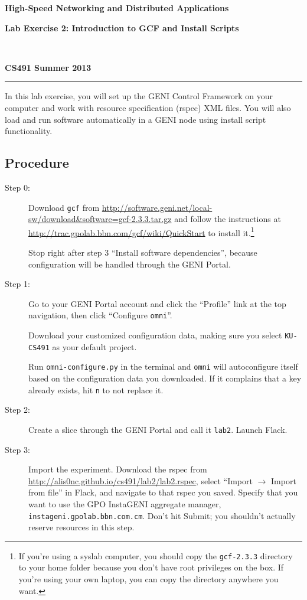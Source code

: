 \documentclass[12pt,letterpaper]{article}
\makeatletter
\newcommand*{\textoverline}[1]{$\overline{\hbox{#1}}\m@th$}
\newcommand*{\fitb}[2]
{\raisebox{-1.3ex}{\textoverline{{\makebox[#1]{{\rule{0pt}{5pt}\tiny #2}}}}}}
\makeatother
\begin{document}
\raggedright
\centerline{\textbf{High-Speed Networking and Distributed Applications}}
\centerline{\textbf{Lab Exercise 2: Introduction to GCF and Install Scripts}}
~\\
\centerline{\textbf{CS491 \hfill Summer 2013}}
\noindent\rule{\textwidth}{1pt}

\bigskip
In this lab exercise, you will set up the GENI Control Framework on your 
computer and work with resource specification (rspec) XML files. You will also 
load and run software automatically in a GENI node using install 
script functionality.


\subsection*{Procedure}

\begin{description}

\item[Step 0:]
Download \texttt{gcf} from  
\url{http://software.geni.net/local-sw/download&software=gcf-2.3.3.tar.gz} 
and follow the instructions at 
\url{http://trac.gpolab.bbn.com/gcf/wiki/QuickStart} to install it.\footnote
    {If you're using a syslab computer, you should copy the 
    \texttt{gcf-2.3.3} directory to your home folder because you don't have 
    root privileges on the box. If you're using your own laptop, you can copy 
    the directory anywhere you want.}
    
Stop right after step 3 ``Install software dependencies'', because 
configuration will be handled through the GENI Portal.

\item[Step 1:]
Go to your GENI Portal account and click the ``Profile'' link at the top 
navigation, then click ``Configure \texttt{omni}''. 

Download your customized configuration data, making sure you select 
\texttt{KU-CS491} as your default project.

Run \texttt{omni-configure.py}
in the terminal and \texttt{omni} will autoconfigure itself based on the 
configuration data you downloaded. If it complains that a key already exists, 
hit \texttt{n} to not replace it.

\item[Step 2:]
Create a slice through the GENI Portal and call it 
\texttt{\fitb{1in}{username}lab2}. Launch Flack.

\item[Step 3:]
Import the experiment. Download the rspec from
\url{http://alis0nc.github.io/cs491/lab2/lab2.rspec}, 
select ``Import $\rightarrow$ Import from file'' in
Flack, and navigate to that rspec you saved.
Specify that you want to use the GPO InstaGENI aggregate manager, 
\texttt{instageni.gpolab.bbn.com.cm}. Don't hit Submit; you shouldn't actually 
reserve resources in this step.


\end{description}
\end{document}
